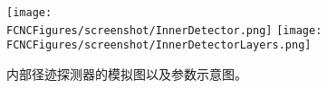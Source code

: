 \begin{figure}[htb]
\centering
\texttt{[image: \\FCNCFigures/screenshot/InnerDetector.png]}
\texttt{[image: \\FCNCFigures/screenshot/InnerDetectorLayers.png]}
\caption{内部径迹探测器的模拟图以及参数示意图。}
\label{fig:InnerDetector}
\end{figure}